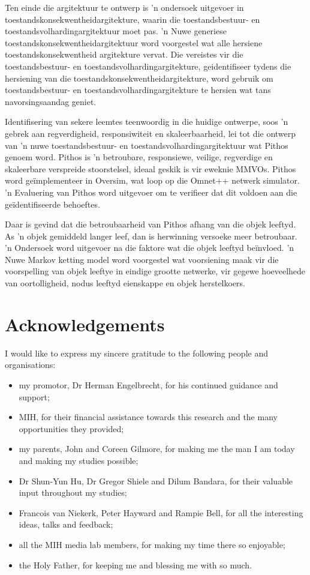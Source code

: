 Ten einde die argitektuur te ontwerp is 'n ondersoek uitgevoer in toestandskonsekwentheidargitekture, waarin die toestandsbestuur- en toestandsvolhardingargitektuur moet pas. 'n Nuwe generiese toestandskonsekwentheidargitektuur word voorgestel wat alle hersiene toestandskonsekwentheid argitekture vervat. Die vereistes vir die toestandsbestuur- en toestandsvolhardingargitekture, geidentifiseer tydens die hersiening van die toestandskonsekwentheidargitekture, word gebruik om toestandsbestuur- en toestandsvolhardingargitekture te hersien wat tans navorsingsaandag geniet.

Identifisering van sekere leemtes teenwoordig in die huidige ontwerpe, soos 'n gebrek aan regverdigheid, responsiwiteit en skaleerbaarheid, lei tot die ontwerp van 'n nuwe toestandsbestuur- en toestandsvolhardingargitektuur wat Pithos genoem word. Pithos is 'n betroubare, responsiewe, veilige, regverdige en skaleerbare verspreide stoorstelsel, ideaal geskik is vir eweknie MMVOs. Pithos word ge\"{i}mplementeer in Oversim, wat loop op die Omnet++ netwerk simulator. 'n Evaluering van Pithos word uitgevoer om te verifieer dat dit voldoen aan die ge\"{i}dentifiseerde behoeftes.

Daar is gevind dat die betroubaarheid van Pithos afhang van die objek leeftyd. As 'n objek gemiddeld langer leef, dan is herwinning versoeke meer betroubaar. 'n Ondersoek word uitgevoer na die faktore wat die objek leeftyd be\"{i}nvloed. 'n Nuwe Markov ketting model word voorgestel wat voorsiening maak vir die voorspelling van objek leeftye in eindige grootte netwerke, vir gegewe hoeveelhede van oortolligheid, nodus leeftyd eienskappe en objek herstelkoers.

\chapter*{Acknowledgements}%

I would like to express my sincere gratitude to the following people and organisations:
\begin{itemize}
  \item my promotor, Dr Herman Engelbrecht, for his continued guidance and support;
  \item MIH, for their financial assistance towards this research and the many opportunities they provided;
  \item my parents, John and Coreen Gilmore, for making me the man I am today and making
  my studies possible;
  \item Dr Shun-Yun Hu, Dr Gregor Shiele and Dilum Bandara, for their valuable input throughout my studies;
  \item Francois van Niekerk, Peter Hayward and Rampie Bell, for all the interesting ideas, talks and feedback;
  \item all the MIH media lab members, for making my time there so enjoyable;
  \item the Holy Father, for keeping me and blessing me with so much.
\end{itemize}

